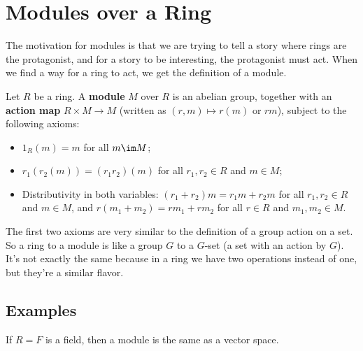 

\section{Modules over a Ring}

The motivation for modules is that we are trying to tell a story where rings are the protagonist, and for a story to be interesting, the protagonist must act. When we find a way for a ring to act, we get the definition of a module. 

\begin{definition}
    Let $R$ be a ring. A \textbf{module} $M$ over $R$ is an abelian group, together with an \textbf{action map} $R \times M \to M$ (written as $(r, m) \mapsto r(m)$ or $rm$), subject to the following axioms:
    \begin{itemize}
        \item $1_R(m) = m$ for all $m \im M$;
        \item $r_1(r_2(m)) = (r_1r_2)(m)$ for all $r_1, r_2 \in R$ and $m \in M$;
        \item Distributivity in both variables: $(r_1 + r_2)m = r_1m + r_2m$ for all $r_1, r_2 \in R$ and $m \in M$, and $r(m_1 + m_2) = rm_1 + rm_2$ for all $r \in R$ and $m_1, m_2 \in M$. 
    \end{itemize}
\end{definition}

The first two axioms are very similar to the definition of a group action on a set. So a ring to a module is like a group $G$ to a $G$-set (a set with an action by $G$). It's not exactly the same because in a ring we have two operations instead of one, but they're a similar flavor.

\subsection{Examples}

\vspace{0.75em}

\begin{example}
    If $R = F$ is a field, then a module is the same as a vector space. 
\end{example}

